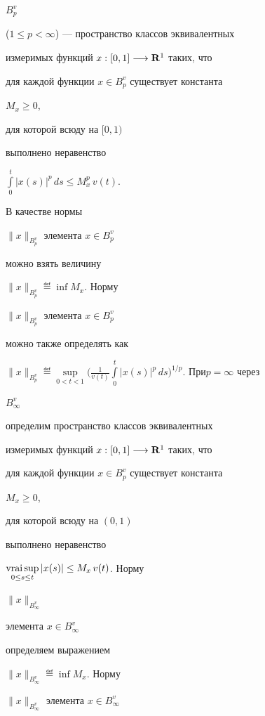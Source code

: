 \begin{defn}


${B}^v_p$


($1\le p < \infty$) --- пространство классов эквивалентных


измеримых функций $x:[0,1]\longrightarrow {\bold R}^1$ таких, что


для каждой функции $x\in { B}^v_p$ существует константа


$M_x \ge 0$,


для которой всюду на $[0,1)$


выполнено неравенство


$\int\limits_0^t |x(s)|^p\,ds \le M^p_x\,v(t)$.


\end{defn}





В качестве нормы


$\|x\|_{B^v_p}$ элемента $x\in { B}^v_p$


можно взять величину


$\|x\|_{B^v_p}\eqdef \inf M_x$. Норму


$\|x\|_{B^v_p}$ элемента $x\in{ B}^v_p$


можно также определять как


$\|x\|_{B^v_p}\eqdef


\sup\limits_{0<t<1}{\Big(\frac{1}{v(t)}\int\limits_0^t


|x(s)|^p\,ds\Big)^{1/p}}$. При\linebreak $p=\infty$ через


${B}^v_\infty$


определим пространство классов эквивалентных


измеримых функций $x:[0,1]\longrightarrow {\bold R}^1$ таких, что


для каждой функции $x\in { B}^v_p$ существует константа


$M_x \ge 0$,


для которой всюду на $(0,1)$


выполнено неравенство


$\vsup{|x(s)|}{0\le s\le t} \le M_x\,v(t)$. Норму


$\|x\|_{B^v_\infty}$


элемента $x\in { B}^v_\infty$


определяем выражением


$\|x\|_{B^v_\infty}\eqdef \inf M_x$. Норму


$\|x\|_{B^v_\infty}$ элемента $x\in { B}^v_\infty$


